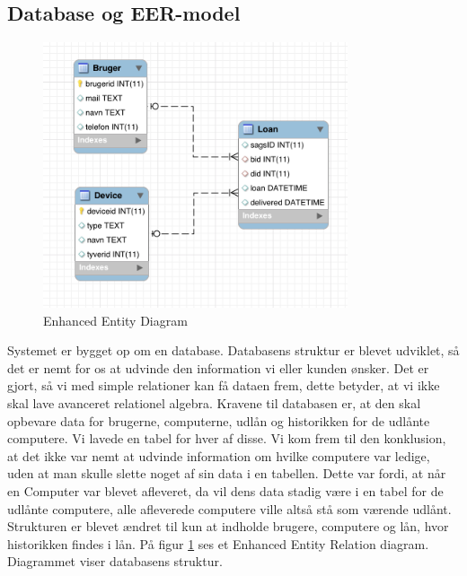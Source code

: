 \documentclass[a4paper]{article}
\begin{document}
\subsection{Database og EER-model}
\begin{figure}[h!]
\includegraphics[width=0.8\textwidth]{EERDiagram}
  \caption{Enhanced Entity Diagram}
  \label{fig:EER}
  \centering
\end{figure}
Systemet er bygget op om en database. Databasens struktur er blevet udviklet, så det er nemt for os at udvinde den information vi eller kunden ønsker. Det er gjort, så vi med simple relationer kan få dataen frem, dette betyder, at vi ikke skal lave avanceret relationel algebra. Kravene til databasen er, at den skal opbevare data for brugerne, computerne, udlån og historikken for de udlånte computere. Vi lavede en tabel for hver af disse. Vi kom frem til den konklusion, at det ikke var nemt at udvinde information om hvilke computere var ledige, uden at man skulle slette noget af sin data i en tabellen. Dette var fordi, at når en Computer var blevet afleveret, da vil dens data stadig være i en tabel for de udlånte computere, alle afleverede computere ville altså stå som værende udlånt. Strukturen er blevet ændret til kun at indholde brugere, computere og lån, hvor historikken findes i lån. På figur \ref{fig:EER} ses et Enhanced Entity Relation diagram. Diagrammet viser databasens struktur.
\end{document}
